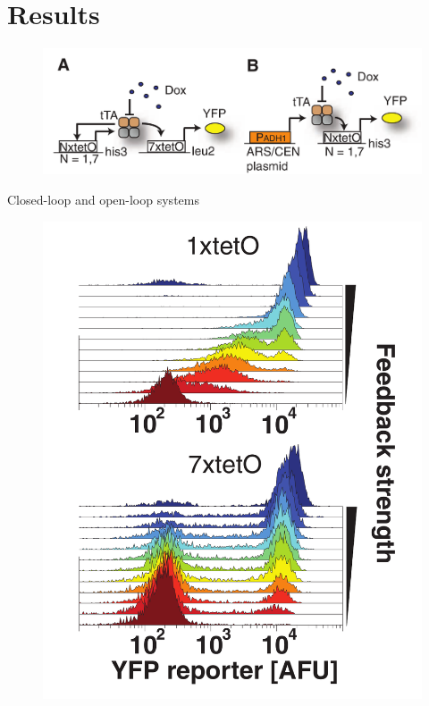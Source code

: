 \documentclass{beamer}
\begin{document}
\section{Results}

\begin{frame}
    \begin{figure}[ht!]
        \centering
        \includegraphics[width=.8\textwidth]{Tofig1b.png}
        \label{fig:fig1to}
    \end{figure}
    \begin{center}
        Closed-loop and open-loop systems
    \end{center}
\end{frame}


\begin{frame}
    \begin{figure}[ht!]
        \centering
        \includegraphics[width=.6\textwidth]{Tofig2.png}
        \label{fig:fig2to}
    \end{figure}
\end{frame}
\end{document}
